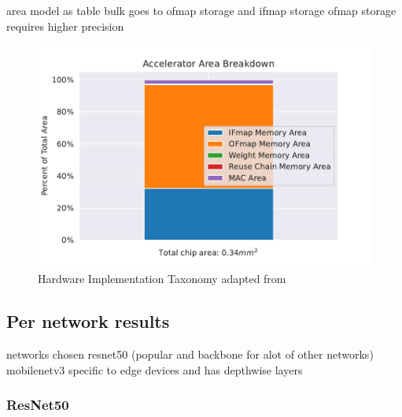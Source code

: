 area model as table
bulk goes to ofmap storage and ifmap storage
ofmap storage requires higher precision

\begin{figure}[ht]
    \centering
    \includegraphics[scale=0.58]{Plots/resources/area.pdf}
    \caption{Hardware Implementation Taxonomy adapted from \cite{maestro}}
    \label{fig:hw_taxonomy}
\end{figure}




\subsection{Per network results}
\label{chap:hero:sim_platform:cigar_side}

networks chosen
resnet50 (popular and backbone for alot of other networks)
mobilenetv3 specific to edge devices and has depthwise layers

\subsubsection{ResNet50}

